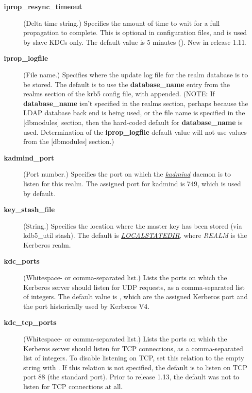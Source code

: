 \documentclass[letterpaper,10pt,english]{sphinxmanual}
\begin{document}
\begin{description}
\item[{\textbf{iprop\_resync\_timeout}}] \leavevmode
(Delta time string.)  Specifies the amount of time to wait for a
full propagation to complete.  This is optional in configuration
files, and is used by slave KDCs only.  The default value is 5
minutes ().  New in release 1.11.

\item[{\textbf{iprop\_logfile}}] \leavevmode
(File name.)  Specifies where the update log file for the realm
database is to be stored.  The default is to use the
\textbf{database\_name} entry from the realms section of the krb5 config
file, with  appended.  (NOTE: If \textbf{database\_name} isn't
specified in the realms section, perhaps because the LDAP database
back end is being used, or the file name is specified in the
{[}dbmodules{]} section, then the hard-coded default for
\textbf{database\_name} is used.  Determination of the \textbf{iprop\_logfile}
default value will not use values from the {[}dbmodules{]} section.)

\item[{\textbf{kadmind\_port}}] \leavevmode
(Port number.)  Specifies the port on which the {\hyperref[admin/admin_commands/kadmind:kadmind-8]{\emph{kadmind}}}
daemon is to listen for this realm.  The assigned port for kadmind
is 749, which is used by default.

\item[{\textbf{key\_stash\_file}}] \leavevmode
(String.)  Specifies the location where the master key has been
stored (via kdb5\_util stash).  The default is {\hyperref[mitK5defaults:paths]{\emph{LOCALSTATEDIR}}}, where \emph{REALM} is the Kerberos realm.

\item[{\textbf{kdc\_ports}}] \leavevmode
(Whitespace- or comma-separated list.)  Lists the ports on which
the Kerberos server should listen for UDP requests, as a
comma-separated list of integers.  The default value is
, which are the assigned Kerberos port and the port
historically used by Kerberos V4.

\item[{\textbf{kdc\_tcp\_ports}}] \leavevmode
(Whitespace- or comma-separated list.)  Lists the ports on which
the Kerberos server should listen for TCP connections, as a
comma-separated list of integers.  To disable listening on TCP,
set this relation to the empty string with .
If this relation is not specified, the default is to listen on TCP
port 88 (the standard port).  Prior to release 1.13, the default
was not to listen for TCP connections at all.


\end{description}
\end{document}
